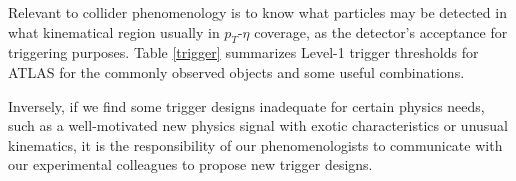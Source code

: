 \documentclass[12pt,prd,aps,floats,preprintnumbers,preprint,superscriptaddress,floatfix,nofootinbib]{revtex4}
\newcommand{ \slashchar }[1]{\setbox0=\hbox{$#1$}   %
   \dimen0=\wd0                                     %
   \setbox1=\hbox{/} \dimen1=\wd1                   %
   \ifdim\dimen0>\dimen1                            %
      \rlap{\hbox to \dimen0{\hfil/\hfil}}          %
      #1                                            %
   \else                                            %
      \rlap{\hbox to \dimen1{\hfil$#1$\hfil}}       %
      /                                             %
   \fi}                                             %
\def\etmiss{\slashchar{E}_{T}}
\def\pt{p_T^{}}
\begin{document}
%

Relevant to collider phenomenology is to know 
what particles may be detected in 
what kinematical region usually in $p_T$-$\eta$ coverage,  
as the detector's acceptance for triggering purposes.
Table \ref{trigger} summarizes Level-1 trigger thresholds for
ATLAS for the commonly observed objects and some useful combinations.

Inversely, if we find some trigger designs inadequate for certain physics 
needs, such as a well-motivated new physics signal with
exotic characteristics or unusual kinematics, 
it is the responsibility of our phenomenologists to communicate 
with our experimental colleagues to propose new trigger designs.
\end{document}
